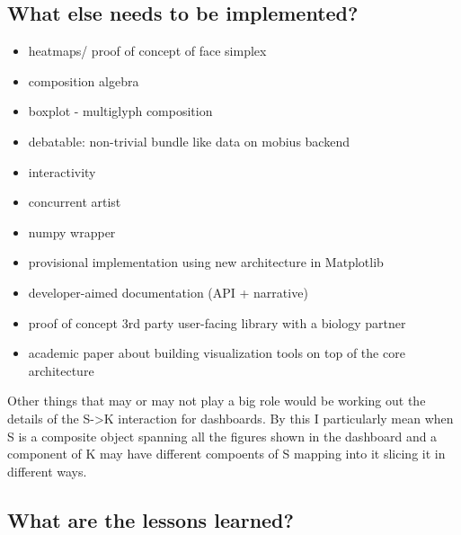 \documentclass[../main.tex]{subfiles}
\begin{document}
\subsection{What else needs to be implemented?}
\begin{itemize}
    \item heatmaps/ proof of concept of face simplex
    \item composition algebra
    \item boxplot - multiglyph composition
    \item debatable: non-trivial bundle like data on mobius backend
    \item interactivity 
    \item concurrent artist
    \item numpy wrapper
\end{itemize}
\begin{itemize}
    \item provisional implementation using new architecture in Matplotlib
    \item developer-aimed documentation (API + narrative)
    \item proof of concept 3rd party user-facing library with a biology partner
    \item academic paper about building visualization tools on top of the core architecture
\end{itemize}
Other things that may or may not play a big role would be working out the details of the S->K interaction for dashboards. By this I particularly mean when S is a composite object spanning all the figures shown in the dashboard and a component of K may have different compoents of S mapping into it slicing it in different ways.
\subsection{What are the lessons learned?}
\end{document}
